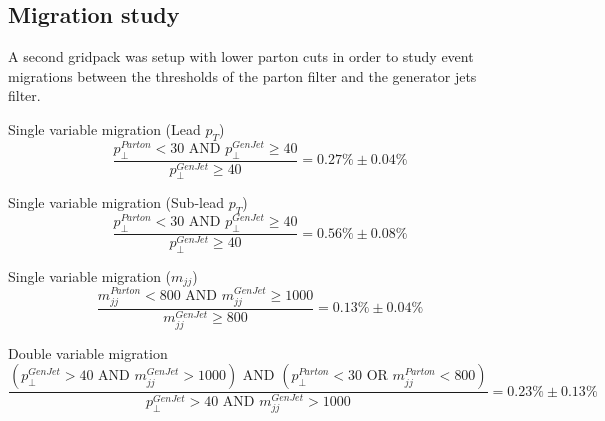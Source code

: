 \subsection{Migration study}

A second gridpack was setup with lower parton cuts in order to study event migrations between the thresholds of the parton filter and the generator jets filter.






Single variable migration (Lead $p_T$)
\begin{equation}
\frac{p_{\perp}^{Parton}<30 \text{ AND } p_{\perp}^{GenJet} \geq 40}{p_{\perp}^{GenJet} \geq 40}=0.27\% \pm 0.04\%
\end{equation}

Single variable migration (Sub-lead $p_T$)
\begin{equation}
\frac{p_{\perp}^{Parton}<30 \text{ AND } p_{\perp}^{GenJet} \geq 40}{p_{\perp}^{GenJet} \geq 40}=0.56\% \pm 0.08\%
\end{equation}

Single variable migration ($m_{jj}$)
\begin{equation}
\frac{m_{jj}^{Parton}<800 \text{ AND } m_{jj}^{GenJet} \geq 1000}{m_{jj}^{GenJet} \geq 800}=0.13\% \pm 0.04\%
\end{equation}

Double variable migration
\begin{equation}
\frac{(p_{\perp}^{GenJet}>40 \text{ AND } m_{jj}^{GenJet}>1000) \text{ AND } (p_{\perp}^{Parton}<30 \text{ OR } m_{jj}^{Parton}<800)}{p_{\perp}^{GenJet}>40 \text{ AND } m_{jj}^{GenJet}>1000} = 0.23\% \pm 0.13\%
\end{equation}





